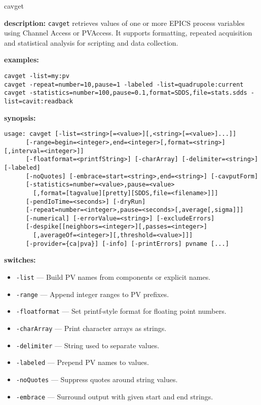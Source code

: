 %
%
\begin{sddsprog}{cavget}
\item \textbf{description:}
\verb+cavget+ retrieves values of one or more EPICS process variables using Channel Access or PVAccess.
It supports formatting, repeated acquisition and statistical analysis for scripting and data collection.
\item \textbf{examples:}
\begin{verbatim}
cavget -list=my:pv
cavget -repeat=number=10,pause=1 -labeled -list=quadrupole:current
cavget -statistics=number=100,pause=0.1,format=SDDS,file=stats.sdds -list=cavit:readback
\end{verbatim}
\item \textbf{synopsis:}
\begin{verbatim}
usage: cavget [-list=<string>[=<value>][,<string>[=<value>]...]]
      [-range=begin=<integer>,end=<integer>[,format=<string>][,interval=<integer>]]
      [-floatformat=<printfString>] [-charArray] [-delimiter=<string>] [-labeled]
      [-noQuotes] [-embrace=start=<string>,end=<string>] [-cavputForm]
      [-statistics=number=<value>,pause=<value>
        [,format=[tagvalue][pretty][SDDS,file=<filename>]]]
      [-pendIoTime=<seconds>] [-dryRun]
      [-repeat=number=<integer>,pause=<seconds>[,average[,sigma]]]
      [-numerical] [-errorValue=<string>] [-excludeErrors]
      [-despike[[neighbors=<integer>][,passes=<integer>]
        [,averageOf=<integer>][,threshold=<value>]]]
      [-provider={ca|pva}] [-info] [-printErrors] pvname [...]
\end{verbatim}
\item \textbf{switches:}
\begin{itemize}
  \item {\tt -list} --- Build PV names from components or explicit names.
  \item {\tt -range} --- Append integer ranges to PV prefixes.
  \item {\tt -floatformat} --- Set printf-style format for floating point numbers.
  \item {\tt -charArray} --- Print character arrays as strings.
  \item {\tt -delimiter} --- String used to separate values.
  \item {\tt -labeled} --- Prepend PV names to values.
  \item {\tt -noQuotes} --- Suppress quotes around string values.
  \item {\tt -embrace} --- Surround output with given start and end strings.

\end{itemize}
\end{sddsprog}
